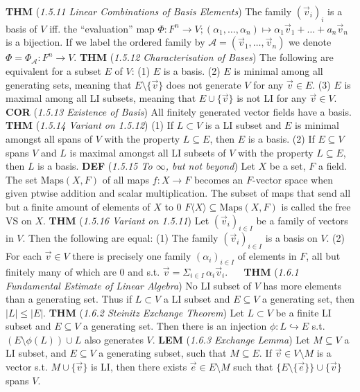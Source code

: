 \documentclass{article}
\newcommand{\wde}[1]{\textcolor{defc}{\textbf{DEF}} (\textcolor{namec}{\textit{#1}})}
\newcommand{\wl}[1]{\textcolor{lemc}{\textbf{LEM}} (\textcolor{namec}{\textit{#1}})}
\newcommand{\wc}[1]{\textcolor{corc}{\textbf{COR}} (\textcolor{namec}{\textit{#1}})}
\newcommand{\wt}[1]{\textcolor{thmc}{\textbf{THM}} (\textcolor{namec}{\textit{#1}})}
\newcommand{\Maps}[0]{\text{Maps}}
\begin{document}
\begin{multicols}{2}
  \wt{1.5.11 Linear Combinations of Basis Elements} The family $(\vec{v}_{i})_{i}$ is a basis of $V$ iff. the ``evaluation'' map $\Phi : F^{n} \to V; (\alpha_{1}, \dots, \alpha_{n}) \mapsto \alpha_{1}\vec{v}_{1} + \dots + a_{n}\vec{v}_{n}$ is a bijection. If we label the ordered family by $\mathcal{A} = (\vec{v}_{1}, \dots, \vec{v}_{n})$ we denote $\Phi = \Phi_{\mathcal{A}} : F^{n} \to V$.
  \wt{1.5.12 Characterisation of Bases} The following are equivalent for a subset $E$ of $V$:
  (1) $E$ is a basis.
  (2) $E$ is minimal among all generating sets, meaning that $E \setminus \{\vec{v}\}$ does not generate $V$ for any $\vec{v} \in E$.
  (3) $E$ is maximal among all LI subsets, meaning that $E \cup \{\vec{v}\}$ is not LI for any $\vec{v} \in V$.
  \wc{1.5.13 Existence of Basis} All finitely generated vector fields have a basis.
  \wt{1.5.14 Variant on 1.5.12}
  (1) If $L \subset V$ is a LI subset and $E$ is minimal amongst all spans of $V$ with the property $L \subseteq E$, then $E$ is a basis.
  (2) If $E \subseteq V$ spans $V$ and $L$ is maximal amongst all LI subsets of $V$ with the property $L \subseteq E$, then $L$ is a basis.
  \wde{1.5.15 To $\infty$, but not beyond} Let $X$ be a set, $F$ a field. The set $\Maps(X,F)$ of all maps $f : X \to F$ becomes an $F$-vector space when given ptwise addition and scalar multiplication. The subset of maps that send all but a finite amount of elements of $X$ to 0 $F \langle X \rangle \subseteq \Maps(X, F)$ is called the free VS on $X$.
  \wt{1.5.16 Variant on 1.5.11} Let $(\vec{v}_{i})_{i \in I}$ be a family of vectors in $V$. Then the following are equal:
  (1) The family $(\vec{v}_{i})_{i \in I}$ is a basis on $V$.
  (2) For each $\vec{v} \in V$ there is precisely one family $(\alpha_{i})_{i \in I}$ of elements in $F$, all but finitely many of which are 0 and s.t. $\vec{v} = \Sigma_{i \in I} \, \alpha_{i}\vec{v}_{i}$.
\ \
  \wt{1.6.1 Fundamental Estimate of Linear Algebra} No LI subset of $V$ has more elements than a generating set. Thus if $L \subset V$ a LI subset and $E \subseteq V$ a generating set, then $|L| \le |E|$.
  \wt{1.6.2 Steinitz Exchange Theorem} Let $L \subset V$ be a finite LI subset and $E \subseteq V$ a generating set. Then there is an injection $\phi : L \hookrightarrow E$ s.t. $(E \setminus \phi(L)) \cup L$ also generates $V$.
  \wl{1.6.3 Exchange Lemma} Let $M \subseteq V$ a LI subset, and $E \subseteq V$ a generating subset, such that $M \subseteq E$. If $\vec{v} \in V \setminus M$ is a vector s.t. $M \cup \{\vec{v}\}$ is LI, then there exists $\vec{e} \in E \setminus M$ such that $\{E \setminus \{\vec{e}\}\} \cup \{\vec{v}\}$ spans $V$.

\end{multicols}
\end{document}
